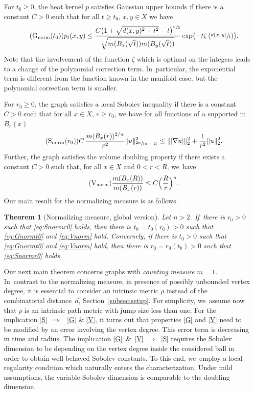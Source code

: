 \documentclass[JEP,XML,SOM,Unicode,published]{cedram}
\newcommand{\spfrac}[2]{\sfrac{#1}{(#2)}}
\newcommand{\norm}{\mathrm{norm}}
\newcommand{\rG}{\mathrm{G}}
\newcommand{\rS}{\mathrm{S}}
\newcommand{\rV}{\mathrm{V}}
\theoremstyle{plain}
\newtheorem{theorem}{Theorem}[section]
\theoremstyle{definition}
\begin{document}
For $t_0\geq 0$,
the heat kernel $p$ satisfies Gaussian upper bounds if there is a constant $C>0$ such that for all $t\geq t_0$, $x,y\in X$ we have
\begin{equation}\tag{$\rG_{\norm}(t_0)$}\label{eq:Gnormt0}
p_t(x,y)\leq \frac{C\bigl(1+\sqrt{{d}(x,y)^2+t^2}-t\bigr)^{\sfrac{n}{2}}}{\sqrt{m(B_x(\sqrt t))m(B_y(\sqrt t))}}\exp\bigl(-t\zeta\left(\sfrac{{d}(x,y)}{t}\right)\bigr).
\end{equation}
Note that the involvement of the function $\zeta$ which is optimal on the integers leads to a change of the polynomial correction term. In~particular, the exponential term is different from the function known in the manifold case, but the polynomial correction term is smaller.

For $r_0\geq 0$, the graph satisfies a local Sobolev inequality if there is a constant $C>0$ such that for all $x\in {X}$, $r\geq r_0$, we have for all functions of $u$ supported in~$B_r(x)$
\begin{equation}\tag{$\rS_{\norm}(r_0)$}\label{eq:Snormr0}
C\,\frac{m(B_x(r))^{2/n}}{r^2}\|u\|_{\spfrac{2n}{n-2}}^2\leq \||\nabla u|\|_2^2+\frac{1}{r^2}\|u\|_2^2.
\end{equation}
Further, the graph satisfies the volume doubling property if there exists a constant $C>0$ such that, for all $x\in X$ and $0<r<R$, we~have
\begin{equation}\tag{$\rV_{\norm}$}\label{eq:Vnorm}
\frac{m(B_x(R))}{m(B_x(r))}\leq C\Bigl(\frac{R}{r}\Bigr)^n.
\end{equation}
Our main result for the normalizing measure is as follows.
\begin{theorem}[Normalizing measure, global version]\label{thm:normalizedglobal}Let $n>2$. If~there is $r_0>0$ such that \eqref{eq:Snormr0} holds, then there is $t_0=t_0(r_0)>0$ such that \eqref{eq:Gnormt0} and \eqref{eq:Vnorm} hold. Conversely, if there is $t_0>0$ such that \eqref{eq:Gnormt0} and \eqref{eq:Vnorm} hold, then there is $r_0=r_0(t_0)>0$ such that \eqref{eq:Snormr0} holds.
\end{theorem}

Our next main theorem concerns graphs with {\it counting measure} $m=1$. In~contrast to the normalizing measure, in presence of possibly unbounded vertex degree, it is essential to consider an intrinsic metric $\rho$ instead of the combinatorial distance~$ d $, \cf Section~\ref{subsec:setup}. For simplicity, we~assume now that $\rho$ is an intrinsic path metric with jump size less than one. For the implication \eqref{S}~$\Rightarrow$~ \eqref{G} \& \eqref{V}, it turns out that properties \eqref{G} and \eqref{V} need to be modified by an error involving the vertex degree. This error term is decreasing in time and radius. The implication \eqref{G}\ \&\ \eqref{V}~$\Rightarrow$~\eqref{S} requires the Sobolev dimension to be depending on the vertex degree inside the considered ball in order to obtain well-behaved Sobolev constants. To this end, we~employ a local regularity condition which naturally enters the characterization. Under mild assumptions, the variable Sobolev dimension is comparable to the doubling dimension.
\end{document}
